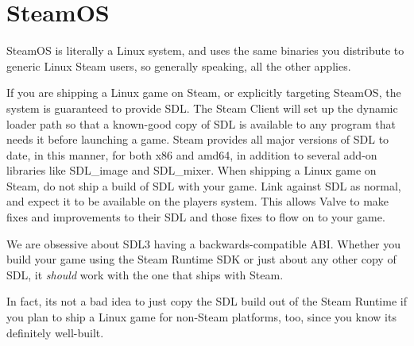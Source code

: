 \chapter{Steam\+OS }
\hypertarget{md__mono_runtime_2extern_2sdl_2docs_2_r_e_a_d_m_e-steamos}{}\label{md__mono_runtime_2extern_2sdl_2docs_2_r_e_a_d_m_e-steamos}
\label{md__mono_runtime_2extern_2sdl_2docs_2_r_e_a_d_m_e-steamos_autotoc_md1447}%
%


Steam\+OS is literally a Linux system, and uses the same binaries you distribute to generic Linux Steam users, so generally speaking, all the other  applies.

If you are shipping a Linux game on Steam, or explicitly targeting Steam\+OS, the system is guaranteed to provide SDL. The Steam Client will set up the dynamic loader path so that a known-\/good copy of SDL is available to any program that needs it before launching a game. Steam provides all major versions of SDL to date, in this manner, for both x86 and amd64, in addition to several add-\/on libraries like {\ttfamily SDL\+\_\+image} and {\ttfamily SDL\+\_\+mixer}. When shipping a Linux game on Steam, do not ship a build of SDL with your game. Link against SDL as normal, and expect it to be available on the player\textquotesingle{}s system. This allows Valve to make fixes and improvements to their SDL and those fixes to flow on to your game.

We are obsessive about SDL3 having a backwards-\/compatible ABI. Whether you build your game using the Steam Runtime SDK or just about any other copy of SDL, it {\itshape should} work with the one that ships with Steam.

In fact, it\textquotesingle{}s not a bad idea to just copy the SDL build out of the Steam Runtime if you plan to ship a Linux game for non-\/\+Steam platforms, too, since you know it\textquotesingle{}s definitely well-\/built. 